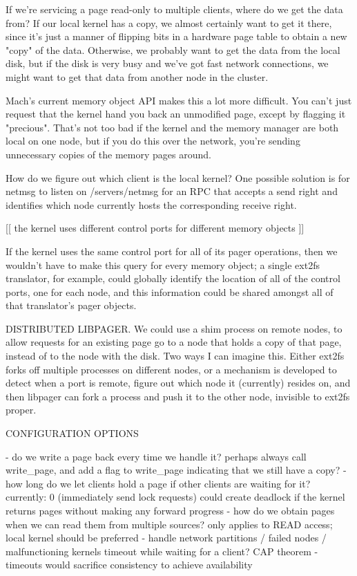 \documentclass{article}
\begin{document}
If we're servicing a page read-only to multiple clients, where do we
get the data from?  If our local kernel has a copy, we almost
certainly want to get it there, since it's just a manner of flipping
bits in a hardware page table to obtain a new "copy" of the data.
Otherwise, we probably want to get the data from the local disk, but
if the disk is very busy and we've got fast network connections, we
might want to get that data from another node in the cluster.

Mach's current memory object API makes this a lot more difficult.  You
can't just request that the kernel hand you back an unmodified page,
except by flagging it "precious".  That's not too bad if the kernel
and the memory manager are both local on one node, but if you do this
over the network, you're sending unnecessary copies of the memory
pages around.

How do we figure out which client is the local kernel?  One possible
solution is for netmsg to listen on /servers/netmsg for an RPC that
accepts a send right and identifies which node currently hosts the
corresponding receive right.

[[ the kernel uses different control ports for different memory objects ]]

  If the kernel uses the same control port for all of its pager
  operations, then we wouldn't have to make this query for every memory
  object; a single ext2fs translator, for example, could globally
  identify the location of all of the control ports, one for each node,
  and this information could be shared amongst all of that translator's
  pager objects.

DISTRIBUTED LIBPAGER.  We could use a shim process on remote nodes, to
allow requests for an existing page go to a node that holds a copy of
that page, instead of to the node with the disk.  Two ways I can
imagine this.  Either ext2fs forks off multiple processes on different
nodes, or a mechanism is developed to detect when a port is remote,
figure out which node it (currently) resides on, and then libpager can
fork a process and push it to the other node, invisible to ext2fs
proper.


CONFIGURATION OPTIONS

- do we write a page back every time we handle it?
  perhaps always call write_page, and add a flag to write_page indicating that we still have a copy?
- how long do we let clients hold a page if other clients are waiting for it?
  currently: 0 (immediately send lock requests)
  could create deadlock if the kernel returns pages without making any forward progress
- how do we obtain pages when we can read them from multiple sources?
  only applies to READ access; local kernel should be preferred
- handle network partitions / failed nodes / malfunctioning kernels
  timeout while waiting for a client?
  CAP theorem - timeouts would sacrifice consistency to achieve availability
\end{document}
